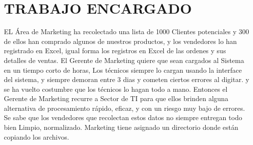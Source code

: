 \section{TRABAJO ENCARGADO} 

EL Área de Marketing ha recolectado una lista de 1000 Clientes potenciales y 300 de ellos han comprado algunos de nuestros productos, y los vendedores lo han registrado en Excel, igual forma los registros en Excel de las ordenes y sus detalles de ventas.
El Gerente de Marketing quiere que sean cargados al Sistema en un tiempo corto de horas, Los técnicos siempre lo cargan usando la interface del sistema, y siempre demoran entre 3 dias y cometen ciertos errores al digitar.
y se ha vuelto costumbre que los técnicos lo hagan todo a mano.
Entonces el Gerente de Marketing recurre a Sector de TI para que ellos brinden alguna alternativa de procesamiento rápido, eficaz, y con un riesgo muy bajo de errores.
Se sabe que los vendedores que recolectan estos datos no siempre entregan todo bien Limpio, normalizado.
Marketing tiene asignado un directorio donde están copiando los archivos.

